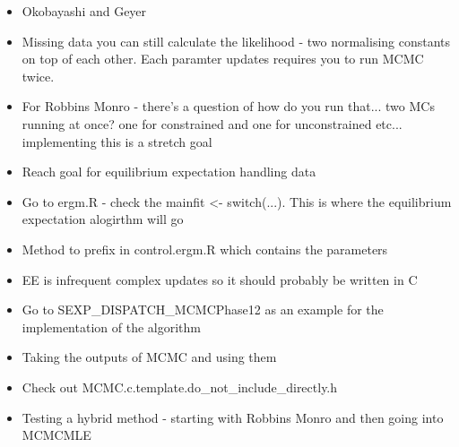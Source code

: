 \begin{itemize}
\begin{itemize}
        \item Okobayashi and Geyer
        \item Missing data you can still calculate the likelihood - two normalising constants on top of each other. Each paramter updates requires you to run MCMC twice. 
        \item For Robbins Monro - there's a question of how do you run that... two MCs running at once? one for constrained and one for unconstrained etc... implementing this is a stretch goal
        \item Reach goal for equilibrium expectation handling data
        \item Go to ergm.R - check the mainfit <- switch(...). This is where the equilibrium expectation alogirthm will go
        \item Method to prefix in control.ergm.R which contains the parameters 
        \item EE is infrequent complex updates so it should probably be written in C
        \item Go to SEXP\_DISPATCH\_MCMCPhase12 as an example for the implementation of the algorithm
        \item Taking the outputs of MCMC and using them 
        \item Check out MCMC.c.template.do\_not\_include\_directly.h
        \item Testing a hybrid method - starting with Robbins Monro and then going into MCMCMLE
    \end{itemize}
\end{itemize}
